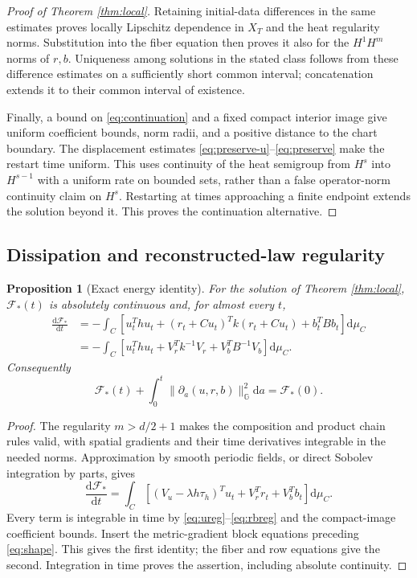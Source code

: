 \documentclass[11pt]{article}
\newtheorem{proposition}[theorem]{Proposition}
\newcommand{\dd}{\mathrm d}
\begin{document}
\begin{proof}[Proof of Theorem \ref{thm:local}]
Retaining initial-data differences in the same estimates proves locally Lipschitz dependence in $X_T$ and the heat regularity norms. Substitution into the fiber equation then proves it also for the $H^1H^m$ norms of $r,b$. Uniqueness among solutions in the stated class follows from these difference estimates on a sufficiently short common interval; concatenation extends it to their common interval of existence.

Finally, a bound on \eqref{eq:continuation} and a fixed compact interior image give uniform coefficient bounds, norm radii, and a positive distance to the chart boundary. The displacement estimates \eqref{eq:preserve-u}--\eqref{eq:preserve} make the restart time uniform. This uses continuity of the heat semigroup from $H^s$ into $H^{s-1}$ with a uniform rate on bounded sets, rather than a false operator-norm continuity claim on $H^s$. Restarting at times approaching a finite endpoint extends the solution beyond it. This proves the continuation alternative.
\end{proof}

\subsection{Dissipation and reconstructed-law regularity}

\begin{proposition}[Exact energy identity]
For the solution of Theorem \ref{thm:local}, $\mathcal F_*(t)$ is absolutely continuous and, for almost every $t$,
\begin{align}
 \frac{\dd\mathcal F_*}{\dd t}
 &=-\int_C\left[u_t^Thu_t+(r_t+Cu_t)^Tk(r_t+Cu_t)+b_t^TBb_t\right]\dd\mu_C\nonumber\\
 &=-\int_C\left[u_t^Thu_t+V_r^Tk^{-1}V_r+V_b^TB^{-1}V_b\right]\dd\mu_C.
 \label{eq:dissipation}
\end{align}
Consequently
\begin{equation}
 \mathcal F_*(t)+\int_0^t\|\partial_a(u,r,b)\|_{\mathbb G}^2\dd a
 =\mathcal F_*(0).
\end{equation}
\end{proposition}
\begin{proof}
The regularity $m>d/2+1$ makes the composition and product chain rules valid, with spatial gradients and their time derivatives integrable in the needed norms. Approximation by smooth periodic fields, or direct Sobolev integration by parts, gives
\begin{equation}
 \frac{\dd\mathcal F_*}{\dd t}
 =\int_C[(V_u-\lambda h\tau_h)^Tu_t+V_r^Tr_t+V_b^Tb_t]\dd\mu_C.
\end{equation}
Every term is integrable in time by \eqref{eq:ureg}--\eqref{eq:rbreg} and the compact-image coefficient bounds. Insert the metric-gradient block equations preceding \eqref{eq:shape}. This gives the first identity; the fiber and row equations give the second. Integration in time proves the assertion, including absolute continuity.
\end{proof}
\end{document}
